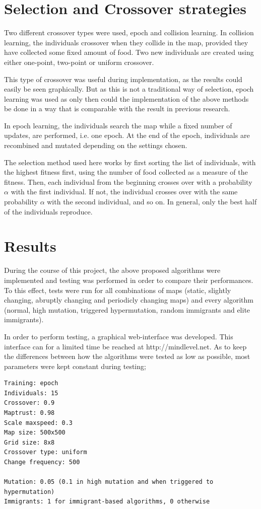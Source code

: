 \documentclass[a4paper,12pt]{article}
\begin{document}
\section{Selection and Crossover strategies}
Two different crossover types were used, epoch and collision learning. In collision learning, the individuals crossover when they collide in the map, provided they have collected some fixed amount of food. Two new individuals are created using either one-point, two-point or uniform crossover.

This type of crossover was useful during implementation, as the results could easily be seen graphically. But as this is not a traditional way of selection, epoch learning was used as only then could the implementation of the above methods be done in a way that is comparable with the result in previous research.

In epoch learning, the individuals search the map while a fixed number of updates, are performed, i.e. one epoch. At the end of the epoch, individuals are recombined and mutated depending on the settings chosen.

The selection method used here works by first sorting the list of individuals, with the highest fitness first, using the number of food collected as a measure of the fitness. Then, each individual from the beginning crosses over with a probability $\alpha$ with the first individual. If not, the individual crosses over with the same probability $\alpha$ with the second individual, and so on. In general, only the best half of the individuals reproduce.

\section{Results}
During the course of this project, the above proposed algorithms were implemented and testing was performed in order to compare their performances. To this effect, tests were run for all combinations of maps (static, slightly changing, abruptly changing and periodicly changing maps) and every algorithm (normal, high mutation, triggered hypermutation, random immigrants and elite immigrants).

In order to perform testing, a graphical web-interface was developed. This interface can for a limited time be reached at http://mindlevel.net. As to keep the differences between how the algorithms were tested as low as possible, most parameters were kept constant during testing;

\begin{lstlisting}
Training: epoch
Individuals: 15
Crossover: 0.9
Maptrust: 0.98
Scale maxspeed: 0.3
Map size: 500x500
Grid size: 8x8
Crossover type: uniform
Change frequency: 500

Mutation: 0.05 (0.1 in high mutation and when triggered to hypermutation)
Immigrants: 1 for immigrant-based algorithms, 0 otherwise
\end{lstlisting}
\end{document}
